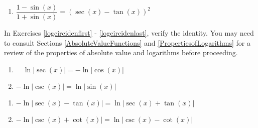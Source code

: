 \documentclass{ximera}
\begin{document}
\begin{multicols}{2}

\begin{enumerate}

\setcounter{enumi}{\value{HW}}

\item $\dfrac{1 - \sin(x)}{1 + \sin(x)} = (\sec(x) - \tan(x))^{2}$ \label{lastcirciden}

\setcounter{HW}{\value{enumi}}

\end{enumerate}

\end{multicols}


In Exercises \ref{logcircidenfirst} - \ref{logcircidenlast}, verify the identity.  You may need to consult Sections \ref{AbsoluteValueFunctions} and \ref{PropertiesofLogarithms} for a review of the properties of absolute value and logarithms before proceeding.

\begin{multicols}{2}

\begin{enumerate}
\setcounter{enumi}{\value{HW}}

\item  $\quad \ln|\sec(x)| = -\ln|\cos(x)|$ \label{logcircidenfirst}
\item  $-\ln|\csc(x)| = \ln|\sin(x)|$

\setcounter{HW}{\value{enumi}}
\end{enumerate}

\end{multicols}

\begin{multicols}{2}

\begin{enumerate}

\setcounter{enumi}{\value{HW}}

\item  $-\ln|\sec(x) - \tan(x)| = \ln|\sec(x)+\tan(x)|$
\item  $-\ln|\csc(x) + \cot(x)|= \ln|\csc(x) - \cot(x)|$ \label{logcircidenlast}

\setcounter{HW}{\value{enumi}}
\end{enumerate}

\end{multicols}
\end{document}
